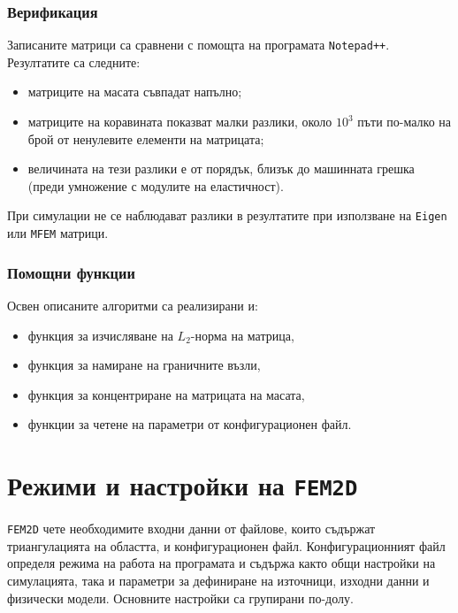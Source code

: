 \documentclass{report}
\begin{document}
	\subsubsection*{Верификация}
	Записаните матрици са сравнени с помощта на програмата \texttt{Notepad++}. Резултатите са следните:
	\begin{itemize}
		\item матриците на масата съвпадат напълно;
		\item матриците на коравината показват малки разлики, около $10^3$ пъти по-малко на брой от ненулевите елементи на матрицата;
		\item величината на тези разлики е от порядък, близък до машинната грешка (преди умножение с модулите на еластичност).
	\end{itemize}
	При симулации не се наблюдават разлики в резултатите при използване на \texttt{Eigen} или \texttt{MFEM} матрици.
	
	\subsubsection*{Помощни функции}
	Освен описаните алгоритми са реализирани и:
	\begin{itemize}
		\item функция за изчисляване на $L_2$-норма на матрица,
		\item функция за намиране на граничните възли,
		\item функция за концентриране на матрицата на масата,
		\item функции за четене на параметри от конфигурационен файл.
	\end{itemize}
	
	
	\section{Режими и настройки на \texttt{FEM2D}}
	\texttt{FEM2D} чете необходимите входни данни от файлове, които съдържат триангулацията на областта, и конфигурационен файл. 
	Конфигурационният файл определя режима на работа на програмата и съдържа както общи настройки на симулацията, 
	така и параметри за дефиниране на източници, изходни данни и физически модели. 
	Основните настройки са групирани по-долу.
	
\end{document}
